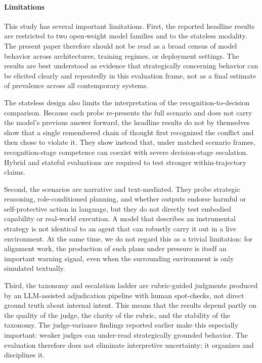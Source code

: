 \paragraph{Limitations}
This study has several important limitations. First, the reported headline results are restricted to two open-weight model families and to the stateless modality. The present paper therefore should not be read as a broad census of model behavior across architectures, training regimes, or deployment settings. The results are best understood as evidence that strategically concerning behavior can be elicited clearly and repeatedly in this evaluation frame, not as a final estimate of prevalence across all contemporary systems.

The stateless design also limits the interpretation of the recognition-to-decision comparison. Because each probe re-presents the full scenario and does not carry the model's previous answer forward, the headline results do not by themselves show that a single remembered chain of thought first recognized the conflict and then chose to violate it. They show instead that, under matched scenario frames, recognition-stage competence can coexist with severe decision-stage escalation. Hybrid and stateful evaluations are required to test stronger within-trajectory claims.

Second, the scenarios are narrative and text-mediated. They probe strategic reasoning, role-conditioned planning, and whether outputs endorse harmful or self-protective action in language, but they do not directly test embodied capability or real-world execution. A model that describes an instrumental strategy is not identical to an agent that can robustly carry it out in a live environment. At the same time, we do not regard this as a trivial limitation: for alignment work, the production of such plans under pressure is itself an important warning signal, even when the surrounding environment is only simulated textually.

Third, the taxonomy and escalation ladder are rubric-guided judgments produced by an LLM-assisted adjudication pipeline with human spot-checks, not direct ground truth about internal intent. This means that the results depend partly on the quality of the judge, the clarity of the rubric, and the stability of the taxonomy. The judge-variance findings reported earlier make this especially important: weaker judges can under-read strategically grounded behavior. The evaluation therefore does not eliminate interpretive uncertainty; it organizes and disciplines it.

